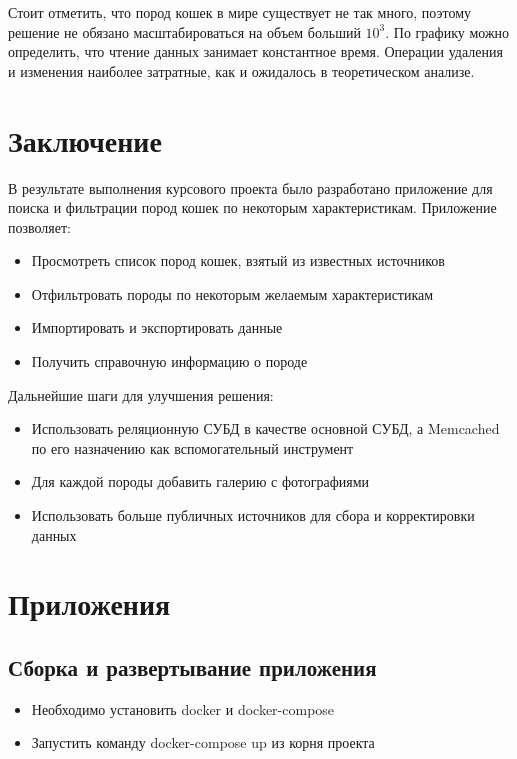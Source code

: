 Стоит отметить, что пород кошек в мире существует не так много, поэтому решение не обязано
масштабироваться на объем больший $10^3$.
По графику можно определить, что чтение данных занимает константное время.
Операции удаления и изменения наиболее затратные, как и ожидалось в теоретическом анализе.

\pagebreak
{}
\section*{Заключение}
В результате выполнения курсового проекта было разработано приложение для
поиска и фильтрации пород кошек по некоторым характеристикам.
Приложение позволяет:
\begin{itemize}
    \item Просмотреть список пород кошек, взятый из известных источников
    \item Отфильтровать породы по некоторым желаемым характеристикам
    \item Импортировать и экспортировать данные
    \item Получить справочную информацию о породе
\end{itemize}

Дальнейшие шаги для улучшения решения:

\begin{itemize}
    \item Использовать реляционную СУБД в качестве основной СУБД, а Memcached по его назначению
    как вспомогательный инструмент
    \item Для каждой породы добавить галерию с фотографиями
    \item Использовать больше публичных источников для сбора и корректировки данных
\end{itemize}

\pagebreak
{}
\section*{Приложения}
\subsection*{Сборка и развертывание приложения}
\begin{itemize}
    \item Необходимо установить docker и docker-compose
    \item Запустить команду docker-compose up из корня проекта
\end{itemize}